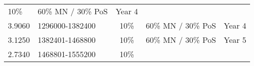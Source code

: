 \documentclass[11pt,a4paperpaper,]{report}
\begin{document}
\begin{longtable}[]{@{}llccc@{}}
\begin{minipage}[t]{0.14\columnwidth}
10\%\strut
\end{minipage} & \begin{minipage}[t]{0.24\columnwidth}\centering\strut
60\% MN / 30\% PoS\strut
\end{minipage} & \begin{minipage}[t]{0.12\columnwidth}\centering\strut
Year 4\strut
\end{minipage}\tabularnewline
\begin{minipage}[t]{0.12\columnwidth}\raggedright\strut
3.9060\strut
\end{minipage} & \begin{minipage}[t]{0.19\columnwidth}\raggedright\strut
1296000-1382400\strut
\end{minipage} & \begin{minipage}[t]{0.14\columnwidth}\centering\strut
10\%\strut
\end{minipage} & \begin{minipage}[t]{0.24\columnwidth}\centering\strut
60\% MN / 30\% PoS\strut
\end{minipage} & \begin{minipage}[t]{0.12\columnwidth}\centering\strut
Year 4\strut
\end{minipage}\tabularnewline
\begin{minipage}[t]{0.12\columnwidth}\raggedright\strut
3.1250\strut
\end{minipage} & \begin{minipage}[t]{0.19\columnwidth}\raggedright\strut
1382401-1468800\strut
\end{minipage} & \begin{minipage}[t]{0.14\columnwidth}\centering\strut
10\%\strut
\end{minipage} & \begin{minipage}[t]{0.24\columnwidth}\centering\strut
60\% MN / 30\% PoS\strut
\end{minipage} & \begin{minipage}[t]{0.12\columnwidth}\centering\strut
Year 5\strut
\end{minipage}\tabularnewline
\begin{minipage}[t]{0.12\columnwidth}\raggedright\strut
2.7340\strut
\end{minipage} & \begin{minipage}[t]{0.19\columnwidth}\raggedright\strut
1468801-1555200\strut
\end{minipage} & \begin{minipage}[t]{0.14\columnwidth}\centering\strut
10\%\strut
\end{minipage} & \begin{minipage}[t]{0.24\columnwidth}\centering\strut

\end{minipage}
\end{longtable}
\end{document}
